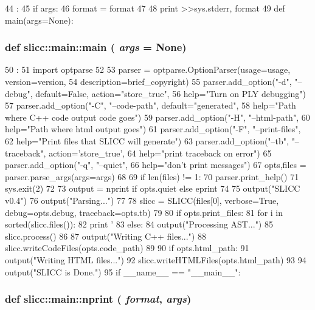 \begin{DoxyCode}
44                          :
45     if args:
46         format = format %
47 
48     print >>sys.stderr, format
49 
def main(args=None):
\end{DoxyCode}
\hypertarget{namespaceslicc_1_1main_aa4ab6984fcc6ca3c4400301d7ce54798}{
\subsubsection[{main}]{\setlength{\rightskip}{0pt plus 5cm}def slicc::main::main ( {\em args} = {\ttfamily None})}}
\label{namespaceslicc_1_1main_aa4ab6984fcc6ca3c4400301d7ce54798}



\begin{DoxyCode}
50                    :
51     import optparse
52 
53     parser = optparse.OptionParser(usage=usage, version=version,
54                                    description=brief_copyright)
55     parser.add_option("-d", "--debug", default=False, action="store_true",
56                       help="Turn on PLY debugging")
57     parser.add_option("-C", "--code-path", default="generated",
58                       help="Path where C++ code output code goes")
59     parser.add_option("-H", "--html-path",
60                       help="Path where html output goes")
61     parser.add_option("-F", "--print-files",
62                       help="Print files that SLICC will generate")
63     parser.add_option("--tb", "--traceback", action='store_true',
64                       help="print traceback on error")
65     parser.add_option("-q", "--quiet",
66                       help="don't print messages")
67     opts,files = parser.parse_args(args=args)
68 
69     if len(files) != 1:
70         parser.print_help()
71         sys.exit(2)
72 
73     output = nprint if opts.quiet else eprint
74 
75     output("SLICC v0.4")
76     output("Parsing...")
77 
78     slicc = SLICC(files[0], verbose=True, debug=opts.debug, traceback=opts.tb)
79 
80     if opts.print_files:
81         for i in sorted(slicc.files()):
82             print '    %
83     else:
84         output("Processing AST...")
85         slicc.process()
86 
87         output("Writing C++ files...")
88         slicc.writeCodeFiles(opts.code_path)
89 
90         if opts.html_path:
91             output("Writing HTML files...")
92             slicc.writeHTMLFiles(opts.html_path)
93 
94     output("SLICC is Done.")
95 
if __name__ == "__main__":
\end{DoxyCode}
\hypertarget{namespaceslicc_1_1main_aebac5c03acd3f8585332f16a87600941}{
\subsubsection[{nprint}]{\setlength{\rightskip}{0pt plus 5cm}def slicc::main::nprint ( {\em format}, \/   {\em args})}}
\label{namespaceslicc_1_1main_aebac5c03acd3f8585332f16a87600941}



